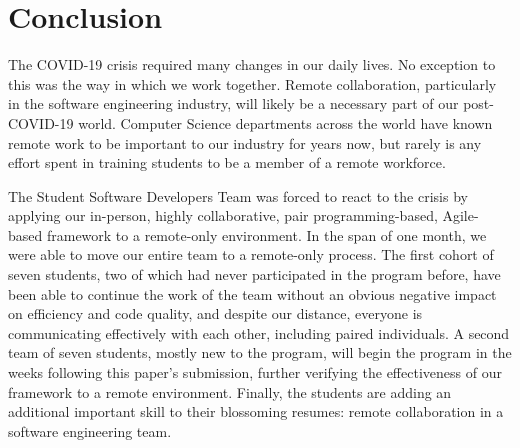 \section{Conclusion}
The COVID-19 crisis required many changes in our daily lives. No exception to this was the way in which we work together. Remote collaboration, particularly in the software engineering industry, will likely be a necessary part of our post-COVID-19 world. Computer Science departments across the world have known remote work to be important to our industry for years now, but rarely is any effort spent in training students to be a member of a remote workforce.

The Student Software Developers Team was forced to react to the crisis by applying our in-person, highly collaborative, pair programming-based, Agile-based framework to a remote-only environment. In the span of one month, we were able to move our entire team to a remote-only process. The first cohort of seven students, two of which had never participated in the program before, have been able to continue the work of the team without an obvious negative impact on efficiency and code quality, and despite our distance, everyone is communicating effectively with each other, including paired individuals. A second team of seven students, mostly new to the program, will begin the program in the weeks following this paper's submission, further verifying the effectiveness of our framework to a remote environment. Finally, the students are adding an additional important skill to their blossoming resumes: remote collaboration in a software engineering team.

